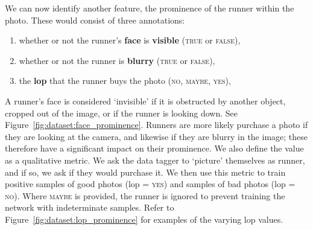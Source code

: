%

\clearpage

We can now identify another feature, the prominence of the runner within the photo. These would consist of three annotations:

\begin{enumerate}
  \item whether or not the runner's \textbf{face} is \textbf{visible} (\textsc{true} or \textsc{false}),
  \item whether or not the runner is \textbf{blurry} (\textsc{true} or \textsc{false}),
  \item the \textbf{\gls{lop}} that the runner buys the photo (\textsc{no}, \textsc{maybe}, \textsc{yes}),
\end{enumerate}

A runner's face is considered `invisible' if it is obstructed by another object, cropped out of the image, or if the runner is looking down. See Figure~\ref{fig:dataset:face_prominence}. Runners are more likely purchase a photo if they are looking at the camera, and likewise if they are blurry in the image; these therefore have a significant impact on their prominence. We also define the  value as a qualitative metric. We ask the data tagger to `picture' themselves as runner, and if so, we ask if they would purchase it. We then use this metric to train positive samples of good photos (\gls{lop} = \textsc{yes}) and samples of bad photos (\gls{lop} = \textsc{no}). Where \textsc{maybe} is provided, the runner is ignored to prevent training the network with indeterminate samples. Refer to Figure~\ref{fig:dataset:lop_prominence} for examples of the varying \gls{lop} values. 

